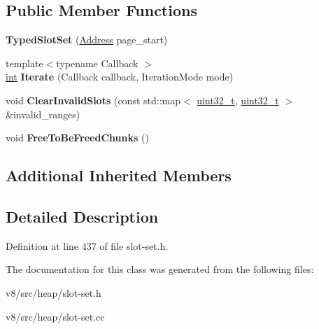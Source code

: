 \subsection*{Public Member Functions}
\begin{DoxyCompactItemize}
\item 
\mbox{\label{classv8_1_1internal_1_1TypedSlotSet_a317b8c8a66c92042fd84c36a691e4d6a}} 
{\bfseries Typed\+Slot\+Set} (\mbox{\hyperlink{classuintptr__t}{Address}} page\+\_\+start)
\item 
\mbox{\label{classv8_1_1internal_1_1TypedSlotSet_a29352b7d397fcac46cce405180c96143}} 
{\footnotesize template$<$typename Callback $>$ }\\\mbox{\hyperlink{classint}{int}} {\bfseries Iterate} (Callback callback, Iteration\+Mode mode)
\item 
\mbox{\label{classv8_1_1internal_1_1TypedSlotSet_ad22d4961ed462a9b2e2febc05d5b1825}} 
void {\bfseries Clear\+Invalid\+Slots} (const std\+::map$<$ \mbox{\hyperlink{classuint32__t}{uint32\+\_\+t}}, \mbox{\hyperlink{classuint32__t}{uint32\+\_\+t}} $>$ \&invalid\+\_\+ranges)
\item 
\mbox{\label{classv8_1_1internal_1_1TypedSlotSet_a0ecabc42bcf668719d2dd92dc4e2c951}} 
void {\bfseries Free\+To\+Be\+Freed\+Chunks} ()
\end{DoxyCompactItemize}
\subsection*{Additional Inherited Members}


\subsection{Detailed Description}


Definition at line 437 of file slot-\/set.\+h.



The documentation for this class was generated from the following files\+:\begin{DoxyCompactItemize}
\item 
v8/src/heap/slot-\/set.\+h\item 
v8/src/heap/slot-\/set.\+cc\end{DoxyCompactItemize}
